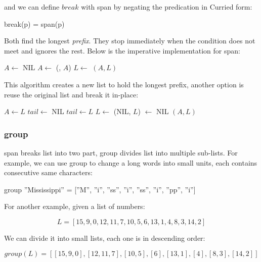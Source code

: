 \documentclass[b5paper]{article}
\begin{document}
and we can define $break$ with span by negating the predication in Curried form:

\be
break(p) = span(\lnot p)
\ee

Both find the longest {\em prefix}. They stop immediately when the condition does not meet and ignores the rest. Below is the imperative implementation for span:

\begin{algorithmic}[1]
  \State $A \gets $ NIL
    \State $A \gets $ (, $A$)
    \State $L \gets $ 
  \EndWhile
  \State \Return $(A, L)$
\EndFunction
\end{algorithmic}

This algorithm creates a new list to hold the longest prefix, another option is reuse the original list and break it in-place:

\begin{algorithmic}[1]
  \State $A \gets L$
  \State $tail \gets$ NIL
    \State $tail \gets L$
    \State $L \gets $ 
  \EndWhile
    \State \Return (NIL, $L$)
  \EndIf
  \State {} $\gets$ NIL
  \State \Return $(A, L)$
\EndFunction
\end{algorithmic}

\subsubsection{group}
span breaks list into two part, group divides list into multiple sub-lists. For example, we can use group to change a long words into small units, each contains consecutive same characters:

\begin{Haskell}
group ''Mississippi'' = [''M'', ''i'', ''ss'', ''i'',
                         ''ss'', ''i'', ''pp'', ''i'']
\end{Haskell}

For another example, given a list of numbers:

\[
L = [15, 9, 0, 12, 11, 7, 10, 5, 6, 13, 1, 4, 8, 3, 14, 2]
\]

We can divide it into small lists, each one is in descending order:

\[
group(L) = [[15, 9, 0], [12, 11, 7], [10, 5], [6], [13, 1], [4], [8, 3], [14, 2]]
\]
\end{document}

